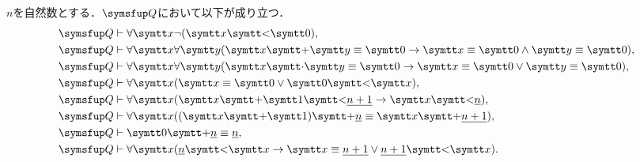 \begin{Lemma} \label{Lemma:Robinsonnumerallemma}
	\(n\)を自然数とする．\(\Robinson\)において以下が成り立つ．
	\begin{align}
		\Robinson & \provable \forall \obj{x} \lnot \paren{\obj{x} \obj{<} \obj{0}},
		\label{eq:Robinsonnumerallemmaminimum}                                                                                                                           \\
		\Robinson & \provable \forall \obj{x} \forall \obj{y} \paren{\obj{x} \obj{+} \obj{y} \objeq \obj{0} \to \obj{x} \objeq \obj{0} \land \obj{y} \objeq \obj{0}},
		\label{eq:Robinsonnumerallemmaadd0}                                                                                                                              \\
		\Robinson & \provable \forall \obj{x} \forall \obj{y} \paren{\obj{x} \obj{\cdot} \obj{y} \objeq \obj{0} \to \obj{x} \objeq \obj{0} \lor \obj{y} \objeq \obj{0}},
		\label{eq:Robinsonnumerallemmacdot0}                                                                                                                             \\
		\Robinson & \provable \forall \obj{x} \paren{\obj{x} \objeq \obj{0} \lor \obj{0} \obj{<} \obj{x}},
		\label{eq:Robinsonnumerallemmaorder}                                                                                                                             \\
		\Robinson & \provable \forall \obj{x} \paren{\obj{x} \obj{+} \obj{1} \obj{<} \numeral{n + 1} \to \obj{x} \obj{<} \numeral{n}},
		\label{eq:Robinsonnumerallemmaordern}                                                                                                                            \\
		\Robinson & \provable \forall \obj{x} \paren{\paren{\obj{x} \obj{+} \obj{1}} \obj{+} \numeral{n} \objeq \obj{x} \obj{+} \numeral{n + 1}},
		\label{eq:Robinsonnumerallemmalinerorderbase}                                                                                                                    \\
		\Robinson & \provable \obj{0} \obj{+} \numeral{n} \objeq \numeral{n},
		\label{eq:Robinsonnumerallemmaadd0commutativelaw}                                                                                                                \\
		\Robinson & \provable \forall \obj{x} \paren{\numeral{n} \obj{<} \obj{x} \to \obj{x} \objeq \numeral{n + 1} \lor \numeral{n + 1} \obj{<} \obj{x}}.
		\label{eq:Robinsonnumerallemmalinerorderbase2}
	\end{align}
\end{Lemma}

